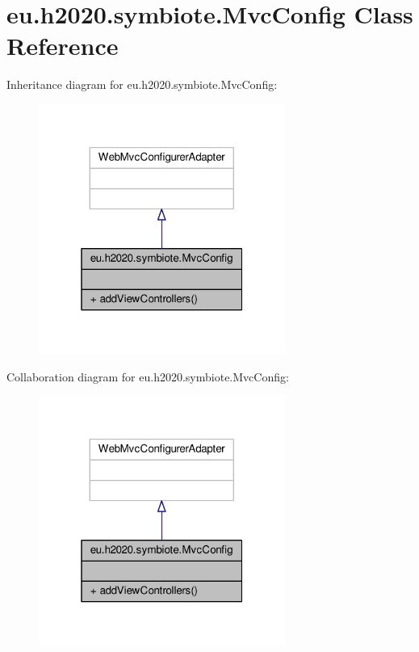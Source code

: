 \hypertarget{classeu_1_1h2020_1_1symbiote_1_1MvcConfig}{}\section{eu.\+h2020.\+symbiote.\+Mvc\+Config Class Reference}
\label{classeu_1_1h2020_1_1symbiote_1_1MvcConfig}


Inheritance diagram for eu.\+h2020.\+symbiote.\+Mvc\+Config\+:
\nopagebreak
\begin{figure}[H]
\begin{center}
\leavevmode
\includegraphics[width=229pt]{classeu_1_1h2020_1_1symbiote_1_1MvcConfig__inherit__graph}
\end{center}
\end{figure}


Collaboration diagram for eu.\+h2020.\+symbiote.\+Mvc\+Config\+:
\nopagebreak
\begin{figure}[H]
\begin{center}
\leavevmode
\includegraphics[width=229pt]{classeu_1_1h2020_1_1symbiote_1_1MvcConfig__coll__graph}
\end{center}
\end{figure}
